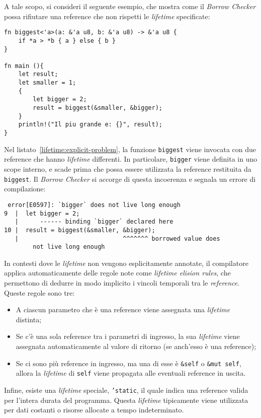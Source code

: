 A tale scopo, si consideri il seguente esempio, che mostra come il \textit{Borrow Checker} possa rifiutare una reference che non rispetti le \textit{lifetime} specificate:
\begin{lstlisting}[style=ruststyle, caption={Limitazioni delle \textit{lifetime}}, label={lifetime:explicit-problem}]
fn biggest<'a>(a: &'a u8, b: &'a u8) -> &'a u8 {
    if *a > *b { a } else { b }
}

fn main (){
    let result;
    let smaller = 1;
    {
        let bigger = 2;
        result = biggest(&smaller, &bigger);
    }
    println!("Il piu grande e: {}", result);
}
\end{lstlisting}
Nel listato~\ref{lifetime:explicit-problem}, la funzione \texttt{biggest} viene invocata con due reference che hanno \textit{lifetime} differenti. In particolare, \texttt{bigger} viene definita in uno scope interno, e scade prima che possa essere utilizzata la reference restituita da \texttt{biggest}. Il \textit{Borrow Checker} si accorge di questa incoerenza e segnala un errore di compilazione:
\begin{verbatim}
 error[E0597]: `bigger` does not live long enough
9  |  let bigger = 2;
   |      ------ binding `bigger` declared here
10 |  result = biggest(&smaller, &bigger);
   |                             ^^^^^^^ borrowed value does
        not live long enough 
\end{verbatim}
\vspace{5pt}
In contesti dove le \textit{lifetime} non vengono esplicitamente annotate, il compilatore applica automaticamente delle regole note come \textit{lifetime elision rules}, che permettono di dedurre in modo implicito i vincoli temporali tra le \textit{reference}. Queste regole sono tre:
\begin{itemize}
    \item A ciascun parametro che è una reference viene assegnata una \textit{lifetime} distinta;
    \item Se c'è una sola reference tra i parametri di ingresso, la sua \textit{lifetime} viene assegnata automaticamente al valore di ritorno (se anch'esso è una reference);
    \item Se ci sono più reference in ingresso, ma una di esse è \texttt{\&self} o \texttt{\&mut self}, allora la \textit{lifetime} di \texttt{self} viene propagata alle eventuali reference in uscita.
\end{itemize}
Infine, esiste una \textit{lifetime} speciale, \texttt{'static}, il quale indica una reference valida per l'intera durata del programma. Questa \textit{lifetime} tipicamente viene utilizzata per dati costanti o risorse allocate a tempo indeterminato.